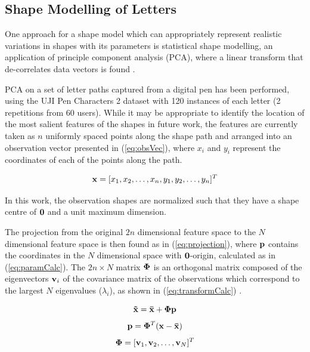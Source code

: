 \documentclass{sig-alternate}
\begin{document}
\subsection{Shape Modelling of Letters} \label{sec:writingGeneration}

One approach for a shape model which can appropriately represent realistic
variations in shapes with its parameters is statistical shape modelling, an
application of principle component analysis (PCA), where a linear transform that
de-correlates data vectors is found \cite{Stegmann2002}. 

PCA on a set of letter paths captured from a digital pen has been performed,
using the UJI Pen Characters 2 dataset \cite{Llorens2008} with 120 instances of
each letter (2 repetitions from 60 users). While it may be appropriate to
identify the location of the most salient features of the shapes in future work,
the features are currently taken as $n$ uniformly spaced points along the shape
path and arranged into an observation vector presented in (\ref{eq:obsVec}),
where $x_i$ and $y_i$ represent the coordinates of each of the points along the
path.

\begin{equation}\label{eq:obsVec}
{\bf x} = [x_1, x_2, \ldots, x_n, y_1, y_2, \ldots, y_n]^T
\end{equation}

In this work, the observation shapes are normalized such that they have a shape
centre of ${\bf 0}$ and a unit maximum dimension. 

The projection from the original $2n$ dimensional feature space to the $N$
dimensional feature space is then found as in (\ref{eq:projection}), where ${\bf
p}$ contains the coordinates in the $N$ dimensional space with ${\bf 0}$-origin,
calculated as in (\ref{eq:paramCalc}). The $2n\times N$ matrix ${\bf \Phi }$ is
an orthogonal matrix composed of the eigenvectors ${\bf v}_i$ of the covariance
matrix of the observations which correspond to the largest $N$ eigenvalues
($\lambda_i$), as shown in (\ref{eq:transformCalc}) \cite{Stegmann2002}. 

\begin{equation}\label{eq:projection}
{\bf \tilde{x}=\bar{x}+\Phi p}
\end{equation}
\begin{equation}\label{eq:paramCalc}
{\bf p} ={\bf \Phi}^T ({\bf {x}-\bar{x}})
\end{equation}
\begin{equation}\label{eq:transformCalc}
{\bf \Phi} = [{\bf v}_1, {\bf v}_2, \ldots, {\bf v}_N]^T
\end{equation}
\end{document}
